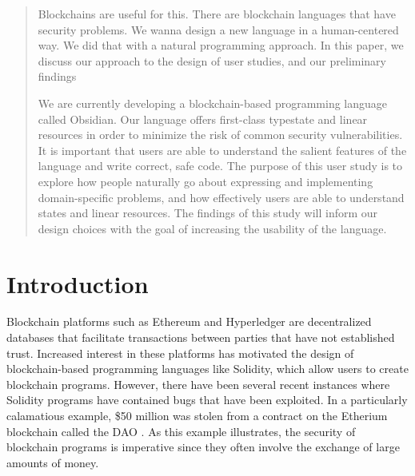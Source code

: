 \documentclass[sigplan,10pt,review,anonymous]{acmart}\settopmatter{printfolios=true}
\begin{document}
\begin{abstract}
Blockchains are useful for this. There are blockchain languages that have security problems.
We wanna design a new language in a human-centered way. We did that with a natural 
programming approach. In this paper, we discuss our approach to the design of user studies,
and our preliminary findings

We are currently developing a blockchain-based programming language called Obsidian. Our language 
offers first-class typestate and linear resources in order to minimize the risk of common security 
vulnerabilities. It is important that users are able to understand the salient features of the 
language and write correct, safe code. The purpose of this user study is to explore how
people naturally go about expressing and implementing domain-specific problems, and how effectively 
users are able to understand states and linear resources. The findings of this study will inform our design 
choices with the goal of increasing the usability of the language.
\end{abstract}



\maketitle


\section{Introduction}

Blockchain platforms such as Ethereum and Hyperledger are decentralized databases that 
facilitate transactions between parties that have not established trust. Increased interest in these 
platforms has motivated the design of blockchain-based programming languages like Solidity, which 
allow users to create blockchain programs. However, there have been several recent instances
where Solidity programs have contained bugs that have been exploited. In a 
particularly calamatious example, \$50 million was stolen from a contract on the Etherium blockchain 
called the DAO \cite{Sirer}. As this example illustrates, the security of blockchain programs is imperative since 
they often involve the exchange of large amounts of money. 
\end{document}
